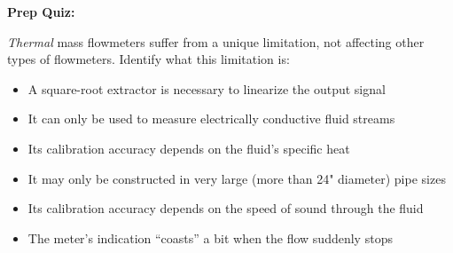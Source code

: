 \noindent
{\bf Prep Quiz:}

{\it Thermal} mass flowmeters suffer from a unique limitation, not affecting other types of flowmeters.  Identify what this limitation is:

\begin{itemize}
\item{} A square-root extractor is necessary to linearize the output signal
\vskip 5pt 
\item{} It can only be used to measure electrically conductive fluid streams
\vskip 5pt 
\item{} Its calibration accuracy depends on the fluid's specific heat
\vskip 5pt 
\item{} It may only be constructed in very large (more than 24" diameter) pipe sizes
\vskip 5pt 
\item{} Its calibration accuracy depends on the speed of sound through the fluid
\vskip 5pt 
\item{} The meter's indication ``coasts'' a bit when the flow suddenly stops
\end{itemize}





